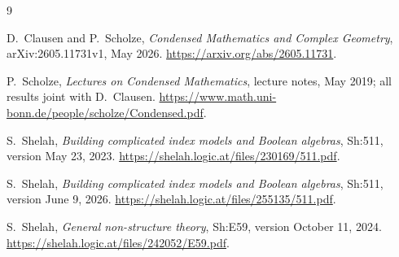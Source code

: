 \documentclass[11pt]{article}
\theoremstyle{definition}
\theoremstyle{remark}
\begin{document}
\begin{thebibliography}{9}
\raggedright

D.~Clausen and P.~Scholze,
\emph{Condensed Mathematics and Complex Geometry},
arXiv:2605.11731v1, May 2026.
\url{https://arxiv.org/abs/2605.11731}.

P.~Scholze,
\emph{Lectures on Condensed Mathematics},
lecture notes, May 2019; all results joint with D.~Clausen.
\url{https://www.math.uni-bonn.de/people/scholze/Condensed.pdf}.

S.~Shelah,
\emph{Building complicated index models and Boolean algebras},
Sh:511, version May 23, 2023.
\url{https://shelah.logic.at/files/230169/511.pdf}.

S.~Shelah,
\emph{Building complicated index models and Boolean algebras},
Sh:511, version June 9, 2026.
\url{https://shelah.logic.at/files/255135/511.pdf}.

S.~Shelah,
\emph{General non-structure theory},
Sh:E59, version October 11, 2024.
\url{https://shelah.logic.at/files/242052/E59.pdf}.

\end{thebibliography}

\end{document}
